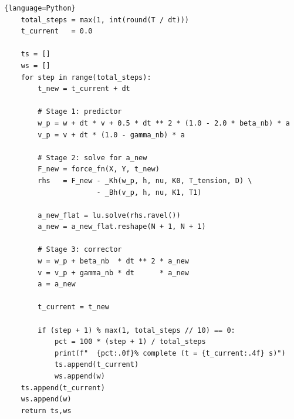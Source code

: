 \begin{lstlisting}{language=Python}
    total_steps = max(1, int(round(T / dt)))
    t_current   = 0.0

    ts = []
    ws = []
    for step in range(total_steps):
        t_new = t_current + dt

        # Stage 1: predictor
        w_p = w + dt * v + 0.5 * dt ** 2 * (1.0 - 2.0 * beta_nb) * a
        v_p = v + dt * (1.0 - gamma_nb) * a

        # Stage 2: solve for a_new
        F_new = force_fn(X, Y, t_new)
        rhs   = F_new - _Kh(w_p, h, nu, K0, T_tension, D) \
                      - _Bh(v_p, h, nu, K1, T1)

        a_new_flat = lu.solve(rhs.ravel())
        a_new = a_new_flat.reshape(N + 1, N + 1)

        # Stage 3: corrector
        w = w_p + beta_nb  * dt ** 2 * a_new
        v = v_p + gamma_nb * dt      * a_new
        a = a_new

        t_current = t_new

        if (step + 1) % max(1, total_steps // 10) == 0:
            pct = 100 * (step + 1) / total_steps
            print(f"  {pct:.0f}% complete (t = {t_current:.4f} s)")
            ts.append(t_current)
            ws.append(w)
    ts.append(t_current)
    ws.append(w)
    return ts,ws
\end{lstlisting}